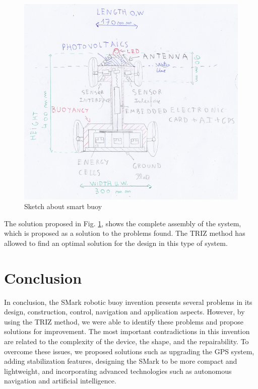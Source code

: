\documentclass[12pt, twoside]{report}
\begin{document}
\begin{figure}[H]
    \centering
    \includegraphics[width=150mm,scale=1]{images/sketch.PNG}
    \caption{Sketch about smart buoy}
    \label{fig:smart}
\end{figure}

The solution proposed in Fig. \ref{fig:smart}, shows the complete assembly of the system, which is proposed as a solution to the problems found. The TRIZ method has allowed to find an optimal solution for the design in this type of system.


\section{Conclusion}

In conclusion, the SMark robotic buoy invention presents several problems in its design, construction, control, navigation and application aspects. However, by using the TRIZ method, we were able to identify these problems and propose solutions for improvement. The most important contradictions in this invention are related to the complexity of the device, the shape, and the repairability. To overcome these issues, we proposed solutions such as upgrading the GPS system, adding stabilization features, designing the SMark to be more compact and lightweight, and incorporating advanced technologies such as autonomous navigation and artificial intelligence.\\
\end{document}
